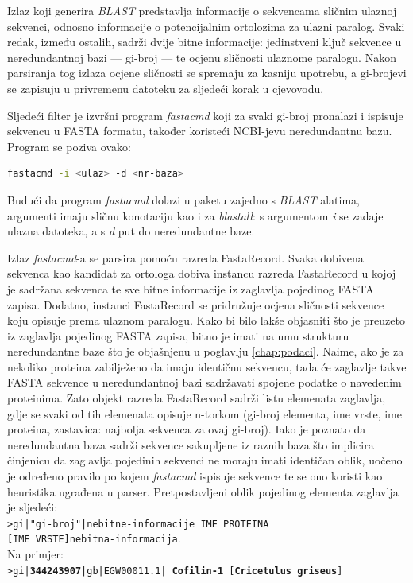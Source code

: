 Izlaz koji generira \emph{BLAST} predstavlja informacije o sekvencama sličnim
ulaznoj sekvenci, odnosno informacije o potencijalnim ortolozima za ulazni
paralog. Svaki redak, između ostalih, sadrži dvije bitne informacije:
jedinstveni ključ sekvence u neredundantnoj bazi --- gi-broj --- te ocjenu
sličnosti ulaznome paralogu. Nakon parsiranja tog izlaza ocjene sličnosti se
spremaju za kasniju upotrebu, a gi-brojevi se zapisuju u privremenu datoteku za
sljedeći korak u cjevovodu.

Sljedeći filter je izvršni program \emph{fastacmd} koji za svaki gi-broj pronalazi
i ispisuje sekvencu u FASTA formatu, također koristeći NCBI-jevu neredundantnu
bazu. Program se poziva ovako:

\begin{lstlisting}[language=bash]
fastacmd -i <ulaz> -d <nr-baza>
\end{lstlisting}

Budući da program \emph{fastacmd} dolazi u paketu zajedno s \emph{BLAST}
alatima, argumenti imaju sličnu konotaciju kao i za \emph{blastall}: s
argumentom \emph{i} se zadaje ulazna datoteka, a s \emph{d} put do neredundantne
baze.

Izlaz \emph{fastacmd}-a se parsira pomoću razreda FastaRecord. Svaka dobivena
sekvenca kao kandidat za ortologa dobiva instancu razreda FastaRecord u kojoj je
sadržana sekvenca te sve bitne informacije iz zaglavlja pojedinog FASTA zapisa.
Dodatno, instanci FastaRecord se pridružuje ocjena sličnosti sekvence koju
opisuje prema ulaznom paralogu. Kako bi bilo lakše objasniti što je preuzeto iz
zaglavlja pojedinog FASTA zapisa, bitno je imati na umu strukturu neredundantne
baze što je objašnjenu u poglavlju \ref{chap:podaci}. Naime, ako je za nekoliko
proteina zabilježeno da imaju identičnu sekvencu, tada će zaglavlje takve FASTA
sekvence u neredundantnoj bazi sadržavati spojene podatke o navedenim
proteinima. 
Zato objekt razreda FastaRecord sadrži listu elemenata zaglavlja,
gdje se svaki od tih elemenata opisuje n-torkom (gi-broj elementa, ime vrste, ime
proteina, zastavica: najbolja sekvenca za ovaj gi-broj). Iako je poznato
da neredundantna baza sadrži sekvence sakupljene iz raznih baza što implicira
činjenicu da zaglavlja pojedinih sekvenci ne moraju imati identičan oblik,
uočeno je određeno pravilo po kojem \emph{fastacmd} ispisuje sekvence te se ono
koristi kao heuristika ugrađena u parser. Pretpostavljeni oblik pojedinog
elementa zaglavlja je sljedeći:\\
\texttt{>gi|"gi-broj"|nebitne-informacije IME PROTEINA}\\
\texttt{[IME VRSTE]nebitna-informacija}.\\
Na primjer:\\
\texttt{>gi|\textbf{344243907}|gb|EGW00011.1| \textbf{Cofilin-1}
[\textbf{Cricetulus griseus}]}\\

